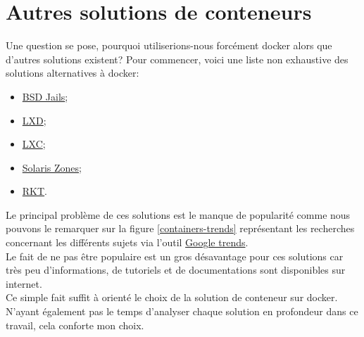 \documentclass[
    iai, %
    il, %
]{heig-tb}
\begin{document}



\section{Autres solutions de conteneurs}
Une question se pose, pourquoi utiliserions-nous forcément \Gls{docker} alors que d'autres solutions existent?
Pour commencer, voici une liste non exhaustive des solutions alternatives à \Gls{docker}:
\begin{itemize}
    \item \href{https://fr.wikipedia.org/wiki/BSD_Jail}{BSD Jails};
    \item \href{https://linuxcontainers.org/lxd/}{LXD};
    \item \href{https://linuxcontainers.org/lxc/introduction/}{LXC};
    \item \href{https://docs.oracle.com/cd/E18440_01/doc.111/e18415/chapter_zones.htm#OPCUG426}{Solaris Zones};
    \item \href{https://www.redhat.com/en/topics/containers/what-is-rkt}{RKT}.
\end{itemize}

Le principal problème de ces solutions est le manque de popularité comme nous pouvons le remarquer sur la
figure \ref{containers-trends} représentant les recherches concernant les différents sujets via l'outil \href{https://trends.google.fr/trends}{Google trends}.\\
Le fait de ne pas être populaire est un gros désavantage pour ces solutions car très peu d'informations, de tutoriels et de documentations sont disponibles sur internet.\\
Ce simple fait suffit à orienté le choix de la solution de \Gls{conteneur} sur \Gls{docker}.\\
N'ayant également pas le temps d'analyser chaque solution en profondeur dans ce travail, cela conforte mon choix.
\end{document}

